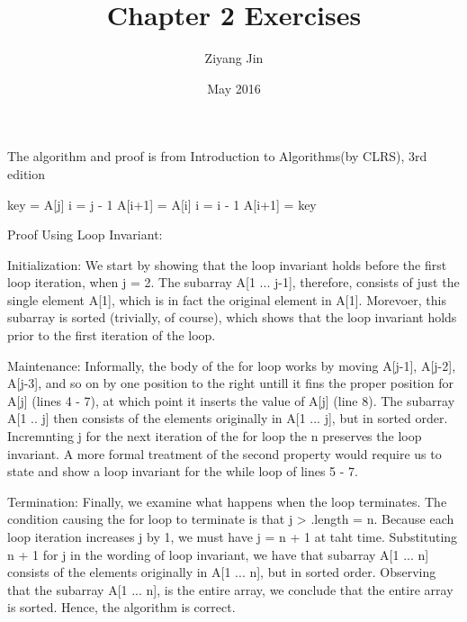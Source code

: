 \documentclass{article}
\title{Chapter 2 Exercises}
\author{Ziyang Jin}
\date{May 2016}
\begin{document}
The algorithm and proof is from Introduction to Algorithms(by CLRS), 3rd edition\par
\begin{algorithm}
\begin{algorithmic}[1]
    \State key = A[j]
    \State i = j - 1
      \State A[i+1] = A[i]
      \State i = i - 1
    \EndWhile
    \State A[i+1] = key
\EndFor
\EndProcedure
\end{algorithmic}
\end{algorithm}

Proof Using Loop Invariant:\par
  Initialization: We start by showing that the loop invariant holds before the first loop iteration, when j = 2. The subarray A[1 ... j-1], therefore, consists of just the single element A[1], which is in fact the original element in A[1]. Morevoer, this subarray is sorted (trivially, of course), which shows that the loop invariant holds prior to the first iteration of the loop.
  
  Maintenance: Informally, the body of the for loop works by moving A[j-1], A[j-2], A[j-3], and so on by one position to the right untill it fins the proper position for A[j] (lines 4 - 7), at which point it inserts the value of A[j] (line 8). The subarray A[1 .. j] then consists of the elements originally in A[1 ... j], but in sorted order. Incremnting j for the next iteration of the for loop the n preserves the loop invariant.
    A more formal treatment of the second property would require us to state and show a loop invariant for the while loop of lines 5 - 7.
  
  Termination: Finally, we examine what happens when the loop terminates. The condition causing the for loop to terminate is that j > .length = n. Because each loop iteration increases j by 1, we must have j = n + 1 at taht time. Substituting n + 1 for j in the wording of loop invariant, we have that subarray A[1 ... n] consists of the elements originally in A[1 ... n], but in sorted order. Observing that the subarray A[1 ... n], is the entire array, we conclude that the entire array is sorted. Hence, the algorithm is correct.
  
\end{document}
